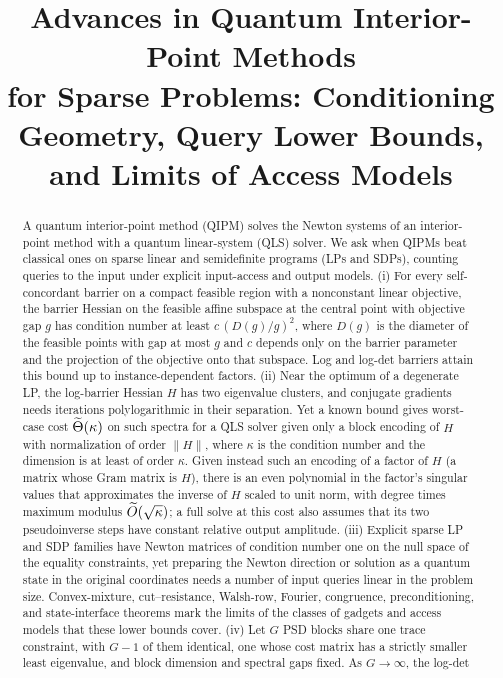 \documentclass[11pt]{article}
\title{Advances in Quantum Interior-Point Methods\\
for Sparse Problems: Conditioning Geometry, Query Lower Bounds, and
Limits of Access Models}
\author{}
\date{}
\theoremstyle{plain}
\theoremstyle{definition}
\theoremstyle{remark}
\begin{document}
\maketitle

\begin{abstract}
A quantum interior-point method (QIPM) solves the Newton systems of an
interior-point method with a quantum linear-system (QLS) solver.  We ask when
QIPMs beat classical ones on sparse linear and semidefinite programs (LPs and
SDPs), counting queries to the input under explicit input-access and output
models.
(i) For every self-concordant barrier on a compact feasible region with a
nonconstant linear objective, the barrier Hessian on the feasible affine
subspace at the central point with objective gap \(g\) has condition number
at least \(c\,(D(g)/g)^2\), where \(D(g)\) is the diameter of the feasible
points with gap at most \(g\) and \(c\) depends only on the barrier
parameter and the projection of the objective onto that subspace.  Log and
log-det barriers attain this bound up to instance-dependent factors.
(ii) Near the optimum of a degenerate LP, the log-barrier Hessian \(H\) has
two eigenvalue clusters, and conjugate gradients needs iterations
polylogarithmic in their separation.  Yet a known bound gives worst-case
cost \(\widetilde{\Theta}(\kappa)\) on such spectra for a QLS solver given only a
block encoding of \(H\) with normalization of order \(\lVert H\rVert\),
where \(\kappa\) is the condition number and the dimension is at least of
order \(\kappa\).  Given instead such an encoding of a factor of \(H\) (a
matrix whose Gram matrix is \(H\)), there is an even polynomial in the
factor's singular values that approximates the inverse of \(H\) scaled to
unit norm, with degree times maximum modulus \(\widetilde{O}(\sqrt\kappa)\); a full solve at this cost also assumes that
its two pseudoinverse steps have constant relative output amplitude.
(iii) Explicit sparse LP and SDP families have Newton matrices of condition
number one on the null space of the equality constraints, yet preparing the
Newton direction or solution as a quantum state in the original coordinates
needs a number of input queries linear in the problem size.
Convex-mixture, cut--resistance, Walsh-row, Fourier, congruence,
preconditioning, and state-interface theorems mark the limits of the classes
of gadgets and access models that these lower bounds cover.
(iv) Let \(G\) PSD blocks share one trace constraint, with \(G-1\) of them
identical, one whose cost matrix has a strictly smaller least eigenvalue,
and block dimension and spectral gaps fixed.  As \(G\to\infty\), the log-det

\end{abstract}
\end{document}
